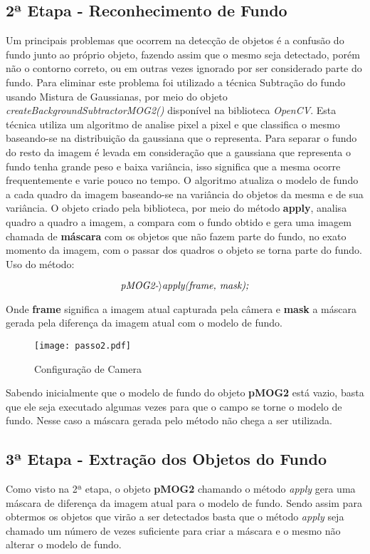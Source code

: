 	\subsection{2ª Etapa - Reconhecimento de Fundo}
	Um principais problemas que ocorrem na detecção de objetos é a confusão do fundo junto ao próprio objeto, fazendo assim que o mesmo seja detectado, porém não o contorno correto, ou em outras vezes ignorado por ser considerado parte do fundo. Para eliminar este problema foi utilizado a técnica  Subtração do fundo usando Mistura de Gaussianas, por meio do objeto \textit{createBackgroundSubtractorMOG2()} disponível na biblioteca \textit{OpenCV}. Esta técnica utiliza um algoritmo de analise pixel a pixel e que classifica o mesmo baseando-se na distribuição da gaussiana que o representa. Para separar o fundo do resto da imagem é levada em consideração que a gaussiana que representa o fundo tenha grande peso e baixa variância, isso significa que a mesma ocorre frequentemente e varie pouco no tempo. O algoritmo atualiza o modelo de fundo a cada quadro da imagem baseando-se na variância do objetos da mesma e de sua variância. O objeto criado pela biblioteca, por meio do método \textbf{apply}, analisa quadro a quadro a imagem, a compara com o fundo obtido e gera uma imagem chamada de \textbf{máscara} com os objetos que não fazem parte do fundo, no exato momento da imagem, com o passar dos quadros o objeto se torna parte do fundo. Uso do método:
\begin{center}
 \begin{displaymath}  \centering \textit{pMOG2-$\rangle$apply(frame, mask);}  \end{displaymath}

\end{center}

Onde \textbf{frame} significa a imagem atual capturada pela câmera e \textbf{mask} a máscara gerada pela diferença da imagem atual com o modelo de fundo. 

\begin{figure}[H]
			\centering
			\texttt{[image: passo2.pdf]}
			\caption{Configuração de Camera}
			\label{Configuracao}
		\end{figure}		


Sabendo inicialmente que o modelo de fundo do objeto \textbf{pMOG2} está vazio, basta que ele seja executado algumas vezes para que o campo se torne o modelo de fundo. Nesse caso a máscara gerada pelo método não chega a ser utilizada.
	\subsection{3ª Etapa - Extração dos Objetos do Fundo}
	Como visto na 2ª etapa, o objeto \textbf{pMOG2} chamando o método \textit{apply} gera uma máscara de diferença da imagem atual para o modelo de fundo. Sendo assim para obtermos os objetos que virão a ser detectados basta que o método \textit{apply} seja chamado um número de vezes suficiente para criar a máscara e o mesmo não alterar o modelo de fundo.
	

